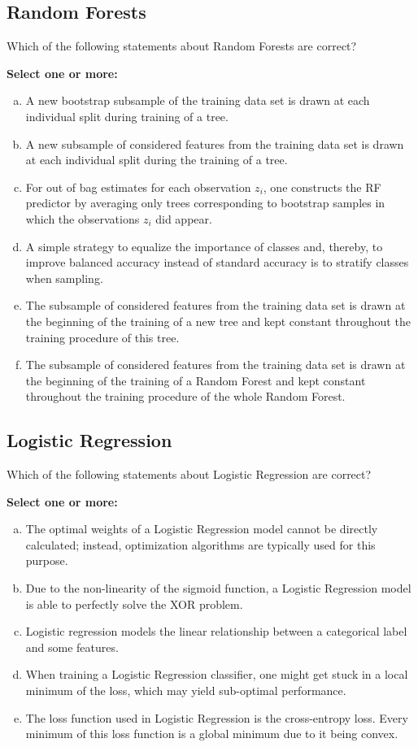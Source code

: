 \documentclass{article}
\begin{document}
\subsection*{Random Forests}

Which of the following statements about Random Forests are correct?

\textbf{Select one or more:}

\begin{enumerate}[(a)]
    \item A new bootstrap subsample of the training data set is drawn at each individual split during training of a tree.
    \item A new subsample of considered features from the training data set is drawn at each individual split during the training of a tree.
    \item For out of bag estimates for each observation \(z_i\), one constructs the RF predictor by averaging only trees corresponding to bootstrap samples in which the observations \(z_i\) did appear.
    \item A simple strategy to equalize the importance of classes and, thereby, to improve balanced accuracy instead of standard accuracy is to stratify classes when sampling.
    \item The subsample of considered features from the training data set is drawn at the beginning of the training of a new tree and kept constant throughout the training procedure of this tree.
    \item The subsample of considered features from the training data set is drawn at the beginning of the training of a Random Forest and kept constant throughout the training procedure of the whole Random Forest.
\end{enumerate}

\subsection*{Logistic Regression}

Which of the following statements about Logistic Regression are correct?

\textbf{Select one or more:}

\begin{enumerate}[(a)]
    \item The optimal weights of a Logistic Regression model cannot be directly calculated; instead, optimization algorithms are typically used for this purpose.
    \item Due to the non-linearity of the sigmoid function, a Logistic Regression model is able to perfectly solve the XOR problem.
    \item Logistic regression models the linear relationship between a categorical label and some features.
    \item When training a Logistic Regression classifier, one might get stuck in a local minimum of the loss, which may yield sub-optimal performance.
    \item The loss function used in Logistic Regression is the cross-entropy loss. Every minimum of this loss function is a global minimum due to it being convex.
\end{enumerate}
\end{document}
